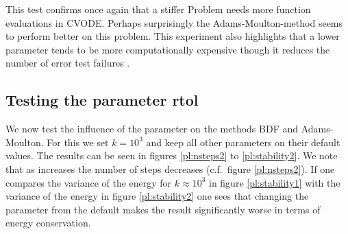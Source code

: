 \documentclass{report}
\begin{document}
This test confirms once again that a stiffer Problem needs more function evaluations in CVODE.
Perhaps surprisingly the Adams-Moulton-method seems to perform better on this problem.
This experiment also highlights that a lower  parameter tends to be more computationally expensive though it reduces the number of error test failures .

\subsection*{Testing the parameter rtol}
We now test the influence of the parameter  on the methods BDF and Adams-Moulton. For this we set $k=10^3$ and keep all other parameters on their default values. The results can be seen in figures \ref{pl:nsteps2} to \ref{pl:stability2}. We note that as  increases the number of steps decreases (c.f.\ figure \ref{pl:nsteps2}). If one compares the variance of the energy for $k\approx10^3$ in figure \ref{pl:stability1} with the variance of the energy in figure \ref{pl:stability2} one sees that changing the  parameter from the default makes the result significantly worse in terms of energy conservation.
\end{document}
